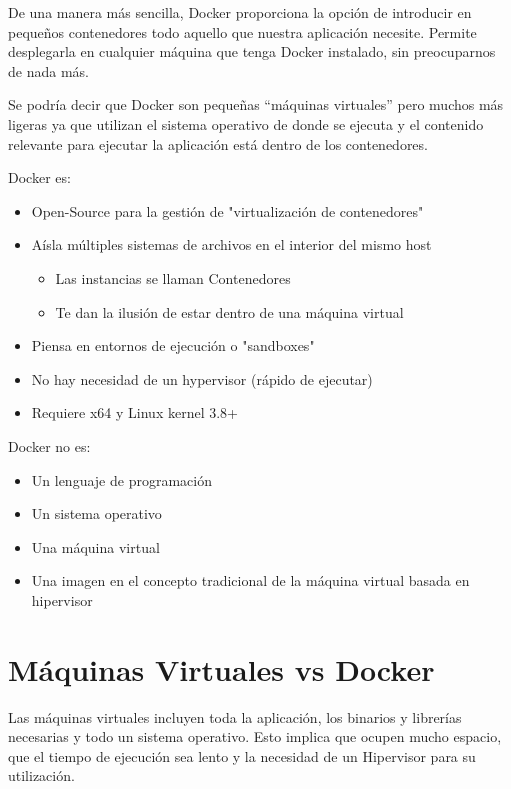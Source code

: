 De una manera más sencilla, Docker proporciona la opción de introducir
en pequeños contenedores todo aquello que nuestra aplicación necesite. Permite desplegarla en cualquier máquina que tenga Docker instalado, sin preocuparnos de nada más. 

Se podría decir que Docker son pequeñas “máquinas virtuales” pero muchos más ligeras ya que utilizan el sistema operativo de donde se ejecuta y el contenido relevante para ejecutar la aplicación está dentro de los contenedores.
\newline 

Docker es:

\begin{itemize}
\item Open-Source para la gestión de "virtualización de contenedores"
\item Aísla múltiples sistemas de archivos en el interior del mismo host
\begin{itemize}
\item Las instancias se llaman Contenedores
\item Te dan la ilusión de estar dentro de una máquina virtual
\end{itemize}
\item Piensa en entornos de ejecución o "sandboxes"
\item No hay necesidad de un hypervisor (rápido de ejecutar)
\item Requiere x64 y Linux kernel 3.8+
\end{itemize}
\pagebreak 
Docker no es:

\begin{itemize}
\item Un lenguaje de programación
\item Un sistema operativo
\item Una máquina virtual
\item Una imagen en el concepto tradicional de la máquina virtual basada en hipervisor
\end{itemize}

\section{Máquinas Virtuales vs Docker}

Las máquinas virtuales incluyen toda la aplicación, los binarios y librerías necesarias y todo un sistema operativo. Esto implica que ocupen mucho espacio, que el tiempo de ejecución sea lento y la necesidad de un Hipervisor para su utilización.

